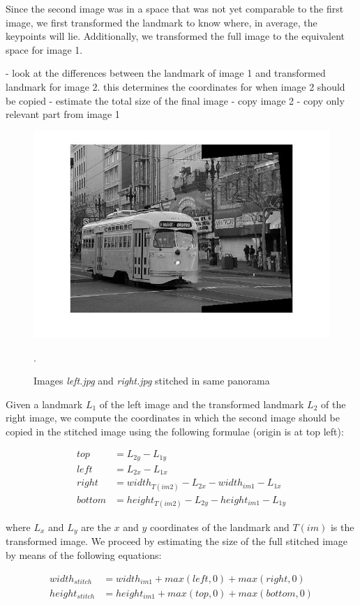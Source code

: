 \documentclass[11pt]{article}
\begin{document}
Since the second image was in a space that was not yet comparable to the first image, we first transformed the landmark to know where, in average, the keypoints will lie. Additionally, we transformed the full image to the equivalent space for image 1. 

- look at the differences between the landmark of image 1 and transformed landmark for image 2. this determines the coordinates for when image 2 should be copied
-  estimate the total size of the final image
- copy image 2
- copy only relevant part from image 1  

\begin{figure}[htpb]
	\centering
	\includegraphics[width=1\textwidth]{imgs/stitched.jpg}
	\caption{Images \textit{left.jpg} and \textit{right.jpg} stitched in same panorama}.
	\label{fig:stitched}
\end{figure}




Given a landmark $L_1$ of the left image and the transformed landmark $L_2$ of
the right image, we compute the coordinates in which the second image should be
copied in the stitched image using the following formulae (origin is at top left):

\begin{equation}
	\begin{split}
		top &= L_{2y} - L_{1y} \\
		left &= L_{2x} - L_{1x} \\
		right &= width_{T(im2)} - L_{2x} - width_{im1} - L_{1x} \\
		bottom &= height_{T(im2)} - L_{2y} - height_{im1} - L_{1y}
	\end{split}
	\label{eq:stitch_corners}
\end{equation}

where $L_x$ and $L_y$ are the $x$ and $y$ coordinates of the landmark and
$T(im)$ is the transformed image. We proceed by estimating the size of the full
stitched image by means of the following equations:

\begin{equation}
	\begin{split}
		width_{stitch} &= width_{im1} + max(left, 0) + max(right, 0) \\
		height_{stitch} &= height_{im1} + max(top, 0) + max(bottom, 0)
	\end{split}
	\label{eq:estimate_stitch}
\end{equation}
\end{document}
